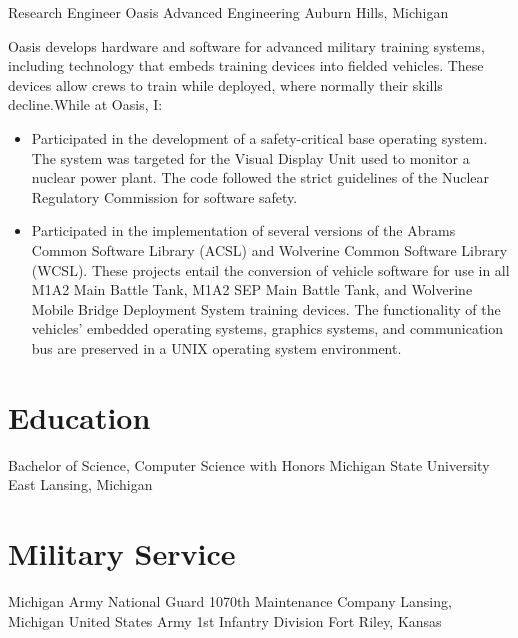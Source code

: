 \documentclass[11pt,letterpaper]{moderncv}
\begin{document}
 {Research Engineer} {Oasis Advanced Engineering} {Auburn Hills, Michigan} {} {%
  Oasis develops hardware and software for advanced military training systems,
  including technology that embeds training devices into fielded
  vehicles. These devices allow crews to train while deployed, where normally
  their skills decline.\newline While at Oasis, I:
  \begin{itemize}
  \item Participated in the development of a safety-critical base
    operating system. The system was targeted for the Visual Display
    Unit used to monitor a nuclear power plant. The code followed the
    strict guidelines of the Nuclear Regulatory Commission for
    software safety.
  \item Participated in the implementation of several versions of the
    Abrams Common Software Library (ACSL) and Wolverine Common
    Software Library (WCSL). These projects entail the conversion of
    vehicle software for use in all M1A2 Main Battle Tank, M1A2 SEP
    Main Battle Tank, and Wolverine Mobile Bridge Deployment System
    training devices. The functionality of the vehicles' embedded
    operating systems, graphics systems, and communication bus are
    preserved in a UNIX operating system environment.
  \end{itemize}
}


\section{Education}
 {Bachelor of Science, Computer Science with Honors} {Michigan State University} {East Lansing, Michigan} {} {}

\section{Military Service}
 {Michigan Army National Guard} {\newline1070th Maintenance Company} {Lansing, Michigan} {} {}
 {United States Army} {1st Infantry Division} {Fort Riley, Kansas} {} {}
\end{document}
